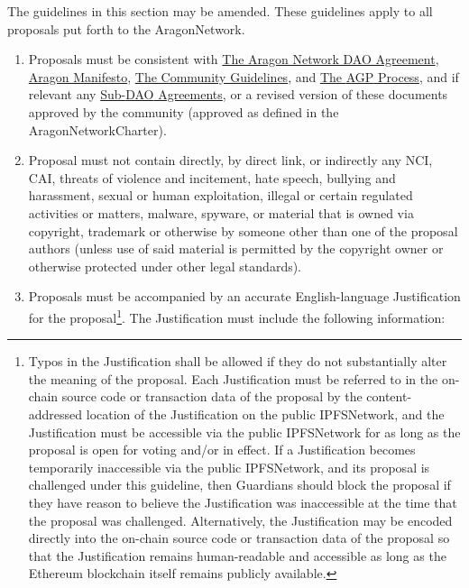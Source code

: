 \begin{enumerate}
	The guidelines in this section may be amended. These guidelines apply to all proposals put forth to the \gls{AragonNetwork}.
	\begin{enumerate}
		\begin{enumerate}
			\item Proposals must be consistent with  
			\hyperref[chap:ANDAOAgreement]{The Aragon Network DAO Agreement}, 
			\hyperref[chap:AragonManifesto]{Aragon Manifesto}, 
			\hyperref[chap:CommunityGuidelines]{The Community Guidelines}, and 
			\hyperref[chap:AGPProcess]{The \ac{AGP} Process}, and if relevant any 
			\hyperref[chap:SubDAOAgreements]{Sub-\ac{DAO} Agreements}, 
			or a revised version of these documents approved by the community (approved as defined in the \gls{AragonNetworkCharter}).
			\item Proposal must not contain directly, by direct link, or indirectly any \ac{NCI}, \ac{CAI},  threats of violence and incitement, hate speech, bullying and harassment, sexual or human exploitation, illegal or certain regulated activities or matters, malware, spyware, or material that is owned via copyright, trademark or otherwise by someone other than one of the proposal authors (unless use of said material is permitted by the copyright owner or otherwise protected under other legal standards).
			\item Proposals must be accompanied by an accurate English-language
			Justification for the proposal\footnote[1]{
				Typos in the Justification shall be allowed if they do not substantially alter the meaning of the proposal. 
				Each Justification must be referred to in the on-chain source code or transaction data of the proposal by the content-addressed location of the Justification on the public \gls{IPFSNetwork}, and the Justification must be accessible via the public \gls{IPFSNetwork} for as long as the proposal is open for voting and/or in effect. 
				If a Justification becomes temporarily inaccessible via the public \gls{IPFSNetwork}, and its proposal is challenged under this guideline, then \glspl{Guardian} should block the proposal if they have reason to believe the Justification was inaccessible at the time that the proposal was challenged. 
				Alternatively, the Justification may be encoded directly into the on-chain source code or transaction data of the proposal so that the Justification remains human-readable and accessible as long as the Ethereum blockchain itself remains publicly available.
			}. 
			The Justification must include the following information:
			

\end{enumerate}
\end{enumerate}
\end{enumerate}

